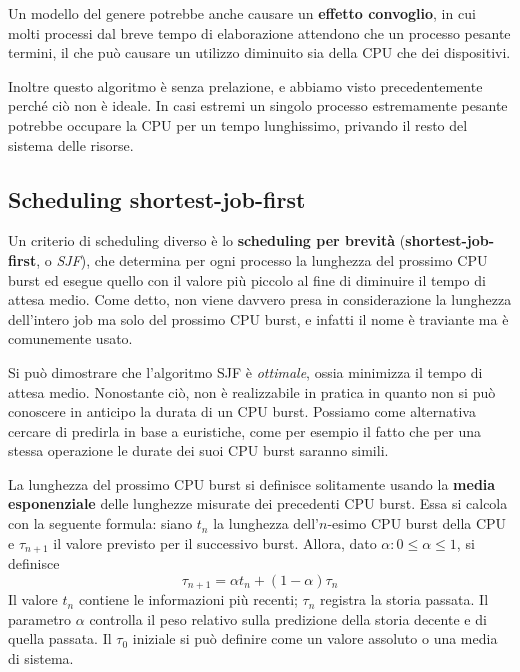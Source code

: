         Un modello del genere potrebbe anche causare un \textbf{effetto convoglio}, in cui molti processi dal breve tempo di elaborazione attendono che un processo pesante termini, il che può causare un utilizzo diminuito sia della CPU che dei dispositivi.
        
        Inoltre questo algoritmo è senza prelazione, e abbiamo visto precedentemente perché ciò non è ideale. In casi estremi un singolo processo estremamente pesante potrebbe occupare la CPU per un tempo lunghissimo, privando il resto del sistema delle risorse.
        
    \subsection{Scheduling shortest-job-first}
        Un criterio di scheduling diverso è lo \textbf{scheduling per brevità} (\textbf{shortest-job-first}, o \textit{SJF}), che determina per ogni processo la lunghezza del prossimo CPU burst ed esegue quello con il valore più piccolo al fine di diminuire il tempo di attesa medio. Come detto, non viene davvero presa in considerazione la lunghezza dell'intero job ma solo del prossimo CPU burst, e infatti il nome è traviante ma è comunemente usato.
        
        Si può dimostrare che l'algoritmo SJF è \textit{ottimale}, ossia minimizza il tempo di attesa medio. Nonostante ciò, non è realizzabile in pratica in quanto non si può conoscere in anticipo la durata di un CPU burst. Possiamo come alternativa cercare di predirla in base a euristiche, come per esempio il fatto che per una stessa operazione le durate dei suoi CPU burst saranno simili.
        
        La lunghezza del prossimo CPU burst si definisce solitamente usando la \textbf{media esponenziale} delle lunghezze misurate dei precedenti CPU burst. Essa si calcola con la seguente formula: siano $t_n$ la lunghezza dell'$n$-esimo CPU burst della CPU e $\tau_{n+1}$ il valore previsto per il successivo burst. Allora, dato $\alpha \colon 0 \leq \alpha \leq 1$, si definisce
        \begin{equation*}
            \tau_{n+1} = \alpha t_n + (1 - \alpha)\tau_n
        \end{equation*}
        Il valore $t_n$ contiene le informazioni più recenti; $\tau_n$ registra la storia passata. Il parametro $\alpha$ controlla il peso relativo sulla predizione della storia decente e di quella passata. Il $\tau_0$ iniziale si può definire come un valore assoluto o una media di sistema.
        
